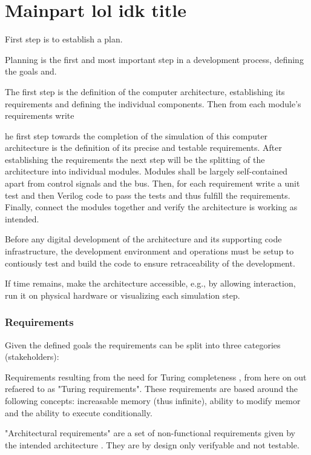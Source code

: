 \chapter{Mainpart lol idk title}

First step is to establish a plan. 

Planning is the first and most important step in a development process, defining the goals and.

The first step is the definition of the computer architecture, establishing its requirements and defining the individual components. Then from each module's requirements write

  he first step towards the completion of the simulation of this computer architecture is the definition of its precise and testable requirements. After establishing the requirements the next step will be the splitting of the architecture into individual modules. Modules shall be largely self-contained apart from control signals and the bus. Then, for each requirement write a unit test and then Verilog code to pass the tests and thus fulfill the requirements. Finally, connect the modules together and verify the architecture is working as intended. 

Before any digital development of the architecture and its supporting code infrastructure, the development environment and operations must be setup to contiously test and build the code to ensure retraceability of the development.

If time remains, make the architecture accessible, e.g., by allowing interaction, run it on physical hardware or visualizing each simulation step.


\subsection{Requirements}
Given the defined goals the requirements can be split into three categories (stakeholders): 

Requirements resulting from the need for Turing completeness \cite{turing1936a}, from here on out refaered to as "Turing requirements". These requirements are based around the following concepts: increasable memory (thus infinite), ability to modify memor and the ability to execute conditionally. 

"Architectural requirements" are a set of non-functional requirements given by the intended architecture \cite{vonneumann1945a}. They are by design only verifyable and not testable. 

